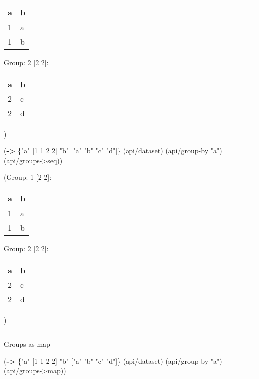 \documentclass[]{article}
\newenvironment{Shaded}{\begin{snugshade}}{\end{snugshade}}
\newcommand{\KeywordTok}[1]{\textcolor[rgb]{0.13,0.29,0.53}{\textbf{#1}}}
\newcommand{\DecValTok}[1]{\textcolor[rgb]{0.00,0.00,0.81}{#1}}
\newcommand{\StringTok}[1]{\textcolor[rgb]{0.31,0.60,0.02}{#1}}
\newcommand{\NormalTok}[1]{#1}
\begin{document}
\begin{longtable}[]{@{}ll@{}}
\toprule
a & b\tabularnewline
\midrule
\endhead
1 & a\tabularnewline
1 & b\tabularnewline
\bottomrule
\end{longtable}

Group: 2 {[}2 2{]}:

\begin{longtable}[]{@{}ll@{}}
\toprule
a & b\tabularnewline
\midrule
\endhead
2 & c\tabularnewline
2 & d\tabularnewline
\bottomrule
\end{longtable}

)

\begin{Shaded}
\begin{Highlighting}[]
\NormalTok{(}\KeywordTok{->}\NormalTok{ \{}\StringTok{"a"}\NormalTok{ [}\DecValTok{1} \DecValTok{1} \DecValTok{2} \DecValTok{2}\NormalTok{]}
     \StringTok{"b"}\NormalTok{ [}\StringTok{"a"} \StringTok{"b"} \StringTok{"c"} \StringTok{"d"}\NormalTok{]\}}
\NormalTok{    (api/dataset)}
\NormalTok{    (api/group-by }\StringTok{"a"}\NormalTok{)}
\NormalTok{    (api/groups->seq))}
\end{Highlighting}
\end{Shaded}

(Group: 1 {[}2 2{]}:

\begin{longtable}[]{@{}ll@{}}
\toprule
a & b\tabularnewline
\midrule
\endhead
1 & a\tabularnewline
1 & b\tabularnewline
\bottomrule
\end{longtable}

Group: 2 {[}2 2{]}:

\begin{longtable}[]{@{}ll@{}}
\toprule
a & b\tabularnewline
\midrule
\endhead
2 & c\tabularnewline
2 & d\tabularnewline
\bottomrule
\end{longtable}

)

\begin{center}\rule{0.5\linewidth}{0.5pt}\end{center}

Groups as map

\begin{Shaded}
\begin{Highlighting}[]
\NormalTok{(}\KeywordTok{->}\NormalTok{ \{}\StringTok{"a"}\NormalTok{ [}\DecValTok{1} \DecValTok{1} \DecValTok{2} \DecValTok{2}\NormalTok{]}
     \StringTok{"b"}\NormalTok{ [}\StringTok{"a"} \StringTok{"b"} \StringTok{"c"} \StringTok{"d"}\NormalTok{]\}}
\NormalTok{    (api/dataset)}
\NormalTok{    (api/group-by }\StringTok{"a"}\NormalTok{)}
\NormalTok{    (api/groups->map))}
\end{Highlighting}
\end{Shaded}
\end{document}
